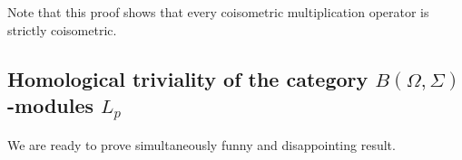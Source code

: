 Note that this proof shows that every coisometric multiplication operator is strictly coisometric.




\subsection{Homological triviality of the category \texorpdfstring{$B(\Omega,\Sigma)$-modules $L_p$}{B(Omega)-modules Lp}}
\label{SubSectionHomologicalTrivialityOfTheCategoryBOmegaSigmaModulesLp}

We are ready to prove simultaneously funny and disappointing result.

